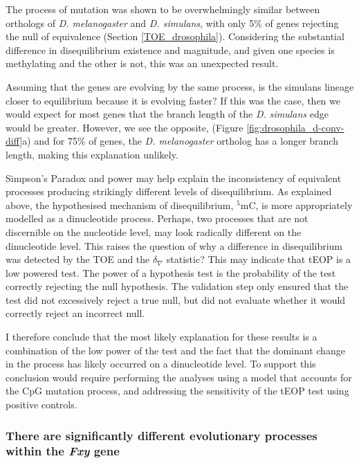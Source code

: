 The process of mutation was shown to be overwhelmingly similar between orthologs of \textit{D. melanogaster} and \textit{D. simulans}, with only 5\% of genes rejecting the null of equivalence (Section \ref{TOE_drosophila}). Considering the substantial difference in disequilibrium existence and magnitude, and given one species is methylating and the other is not, this was an unexpected result. 

Assuming that the genes are evolving by the same process, is the simulans lineage closer to equilibrium because it is evolving faster? If this was the case, then we would expect for most genes that the branch length of the \textit{D. simulans} edge would be greater. However, we see the opposite, (Figure \ref{fig:drosophila_d-conv-diff}a) and for 75\% of genes, the \textit{D. melanogaster} ortholog has a longer branch length, making this explanation unlikely. 

Simpson's Paradox and power may help explain the inconsistency of equivalent processes producing strikingly different levels of disequilibrium. As explained above, the hypothesised mechanism of disequilibrium, $^5$mC, is more appropriately modelled as a dinucleotide process. Perhaps, two processes that are not discernible on the nucleotide level, may look radically different on the dinucleotide level. This raises the question of why a difference in disequilibrium was detected by the TOE and the $\delta_\nabla$ statistic? This may indicate that tEOP is a low powered test. The power of a hypothesis test is the probability of the test correctly rejecting the null hypothesis. The validation step only ensured that the test did not excessively reject a true null, but did not evaluate whether it would correctly reject an incorrect null.

I therefore conclude that the most likely explanation for these results is a combination of the low power of the test and the fact that the dominant change in the process has likely occurred on a dinucleotide level. To support this conclusion would require performing the analyses using a model that accounts for the CpG mutation process, and addressing the sensitivity of the tEOP test using positive controls. 

\subsubsection{There are significantly different evolutionary processes within the \textit{Fxy} gene}

